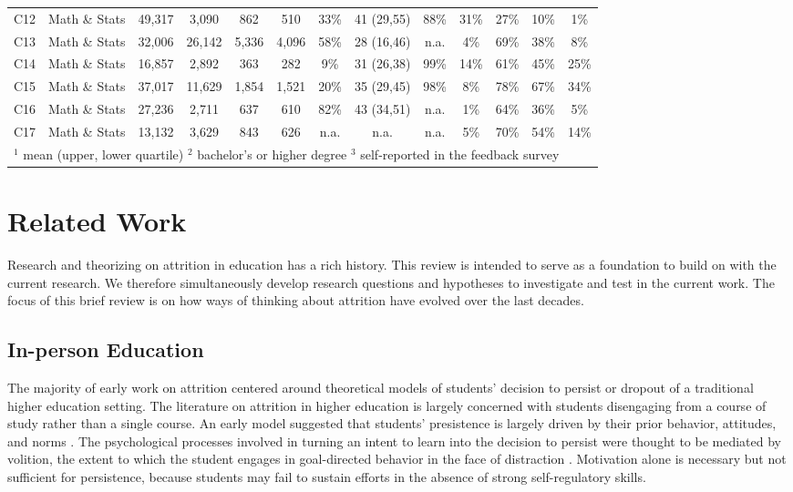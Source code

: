 \documentclass{sigchi}\usepackage[]{graphicx}\usepackage[]{color}
\begin{document}
\begin{table}[th]
\begin{tabular}{llccccccccccc}
C12 & Math \& Stats & 49,317 & 3,090 & 862   & 510      & 33\%   & 41 (29,55) & 88\%       & 31\% & 27\% & 10\% & 1\% \\
C13 & Math \& Stats & 32,006 & 26,142 & 5,336 & 4,096   & 58\%   & 28 (16,46) & n.a.       & 4\%  & 69\% & 38\% & 8\% \\
C14 & Math \& Stats & 16,857 & 2,892 & 363   & 282      & 9\%    & 31 (26,38) & 99\%       & 14\% & 61\% & 45\% & 25\% \\
C15 & Math \& Stats & 37,017 & 11,629 & 1,854 & 1,521   & 20\%   & 35 (29,45) & 98\%       & 8\%  & 78\% & 67\% & 34\% \\
C16 & Math \& Stats & 27,236 & 2,711 & 637   & 610      & 82\%   & 43 (34,51) & n.a.       & 1\%  & 64\% & 36\% & 5\% \\
C17 & Math \& Stats & 13,132 & 3,629 & 843   & 626      & n.a.   & n.a.       & n.a.       & 5\%  & 70\% & 54\% & 14\% \\
\bottomrule
\multicolumn{13}{l}{$^1$ mean (upper, lower quartile)  $^2$ bachelor's or higher degree  $^3$ self-reported in the feedback survey}
\end{tabular}
\end{table}


\section{Related Work}

Research and theorizing on attrition in education has a rich history. This review is intended to serve as a foundation to build on with the current research. We therefore simultaneously develop research questions and hypotheses to investigate and test in the current work. The focus of this brief review is on how ways of thinking about attrition have evolved over the last decades. 

\subsection{In-person Education}

The majority of early work on attrition centered around theoretical models of students' decision to persist or dropout of a traditional higher education setting. The literature on attrition in higher education is largely concerned with students disengaging from a course of study rather than a single course. An early model suggested that students' presistence is largely driven by their prior behavior, attitudes, and norms \cite{fishbein1975belief}. The psychological processes involved in turning an intent to learn into the decision to persist were thought to be mediated by volition, the extent to which the student engages in goal-directed behavior in the face of distraction \cite{corno1993role}. Motivation alone is necessary but not sufficient for persistence, because students may fail to sustain efforts in the absence of strong self-regulatory skills.
\end{document}
